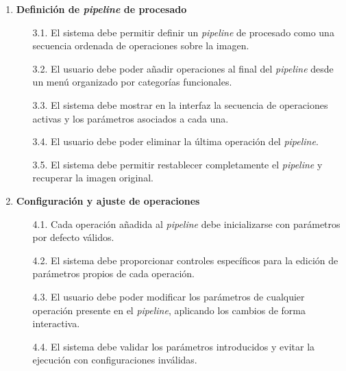 \begin{enumerate}
	\item \textbf{Definición de \textit{pipeline} de procesado}\label{req:rf-3}
	\begin{enumerate}
		\item[3.1.] El sistema debe permitir definir un \textit{pipeline} de procesado como una secuencia ordenada de operaciones sobre la imagen.\label{req:rf-3-1}
		\item[3.2.] El usuario debe poder añadir operaciones al final del \textit{pipeline} desde un menú organizado por categorías funcionales.\label{req:rf-3-2}
		\item[3.3.] El sistema debe mostrar en la interfaz la secuencia de operaciones activas y los parámetros asociados a cada una.\label{req:rf-3-3}
		\item[3.4.] El usuario debe poder eliminar la última operación del \textit{pipeline}.\label{req:rf-3-4}
		\item[3.5.] El sistema debe permitir restablecer completamente el \textit{pipeline} y recuperar la imagen original.\label{req:rf-3-5}
	\end{enumerate}

	\vspace{0.5em}

	\item \textbf{Configuración y ajuste de operaciones}\label{req:rf-4}
	\begin{enumerate}
		\item[4.1.] Cada operación añadida al \textit{pipeline} debe inicializarse con parámetros por defecto válidos.\label{req:rf-4-1}
		\item[4.2.] El sistema debe proporcionar controles específicos para la edición de parámetros propios de cada operación.\label{req:rf-4-2}
		\item[4.3.] El usuario debe poder modificar los parámetros de cualquier operación presente en el \textit{pipeline}, aplicando los cambios de forma interactiva.\label{req:rf-4-3}
		\item[4.4.] El sistema debe validar los parámetros introducidos y evitar la ejecución con configuraciones inválidas.\label{req:rf-4-4}
	\end{enumerate}

	\vspace{0.5em}


\end{enumerate}
